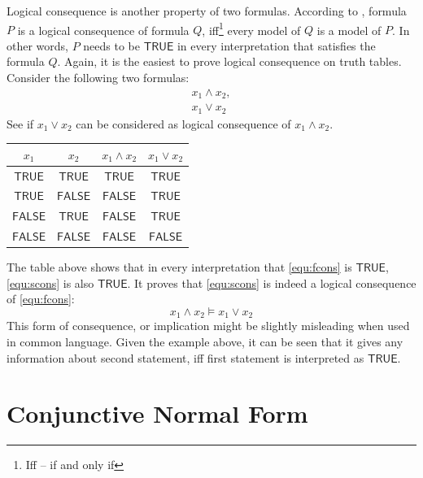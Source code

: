 \documentclass[12pt,english,pdflatex]{aghdpl}
\begin{document}
Logical consequence is another property of two formulas. According to \cite{ben-ari:2001}, formula $P$ is a logical consequence of formula $Q$, iff\footnote{Iff -- if and only if} every model of $Q$ is a model of $P$. In other words, $P$ needs to be $\mathsf{TRUE}$ in every interpretation that satisfies the formula $Q$. Again, it is the easiest to prove logical consequence on  truth tables. Consider the following two formulas:
\begin{gather}
x_1 \wedge x_2\label{equ:fcons}, \\
x_1 \vee x_2\label{equ:scons}
\end{gather}
See if $x_1 \vee x_2$ can be considered as logical consequence of $x_1 \wedge x_2$.

\begin{center}
\setlength{\tabcolsep}{6pt}
\begin{tabular}{c|c|c|c}
  $x_1$   &   $x_2$ & $x_1 \wedge x_2$ & $x_1 \vee x_2$ \\
  \hline
  $\mathsf{TRUE}$ & $\mathsf{TRUE}$ & $\mathsf{TRUE}$ &  $\mathsf{TRUE}$  \\
  $\mathsf{TRUE}$ & $\mathsf{FALSE}$ & $\mathsf{FALSE}$ &  $\mathsf{TRUE}$  \\
  $\mathsf{FALSE}$ & $\mathsf{TRUE}$ & $\mathsf{FALSE}$ &  $\mathsf{TRUE}$  \\
  $\mathsf{FALSE}$ & $\mathsf{FALSE}$ & $\mathsf{FALSE}$ &  $\mathsf{FALSE}$
\end{tabular}
\end{center}

The table above shows that in every interpretation that \ref{equ:fcons} is $\mathsf{TRUE}$, \ref{equ:scons} is also $\mathsf{TRUE}$. It proves that \ref{equ:scons} is indeed a logical consequence of \ref{equ:fcons}:
\[
x_1 \wedge x_2 \models x_1 \vee x_2
\]
This form of consequence, or implication might be slightly misleading when used in common language. Given the example above, it can be seen that it gives any information about second statement, iff first statement is interpreted as $\mathsf{TRUE}$.

\section{Conjunctive Normal Form}
\label{sec:CNF}
\end{document}
